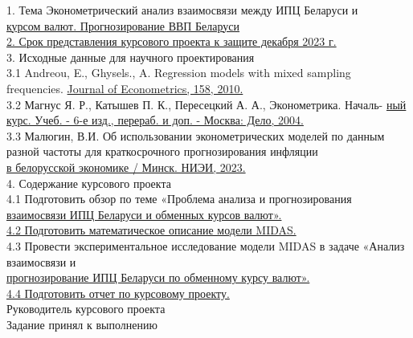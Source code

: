\documentclass[a4paper, 12pt]{extarticle}
\begin{document}
	1. Тема \hspace{3mm} Эконометрический анализ взаимосвязи между ИПЦ Беларуси и\\
	\hspace*{22mm}\underline{курсом валют. Прогнозирование ВВП Беларуси\hspace*{\linegoal}}\\[2mm]
	\underline{2. Срок представления курсового проекта к защите  \quad {} декабря 2023 г.\hspace*{\linegoal}}\\[2mm]
	3. Исходные данные для научного проектирования\\[2mm]
	3.1 Andreou, E., Ghysels., A. Regression models with mixed sampling frequencies.
	\underline{Journal of Econometrics, 158, 2010.\hspace*{\linegoal}}\\[2mm]
	3.2 Магнус Я. Р., Катышев П. К., Пересецкий А. А., Эконометрика. Началь-
	\underline{ный курс. Учеб. - 6-е изд., перераб. и доп. - Москва: Дело, 2004.\hspace*{\linegoal}} \\[2mm]
	3.3 Малюгин, В.И. Об использовании эконометрических моделей по данным разной частоты для краткосрочного прогнозирования инфляции\\
	\underline{в белорусской экономике / Минск. НИЭИ, 2023.\hspace*{\linegoal}}\\[2mm]
	4. Содержание курсового проекта\\[2mm]
	4.1 Подготовить обзор по теме «Проблема анализа и прогнозирования \\
	\underline{взаимосвязи ИПЦ Беларуси и обменных курсов валют».\hspace*{\linegoal}}\\[2mm]
	\underline{4.2 Подготовить математическое описание модели MIDAS.\hspace*{\linegoal}}\\[2mm]
	4.3 Провести экспериментальное исследование модели MIDAS в задаче «Анализ взаимосвязи и\\
	\underline{прогнозирование ИПЦ Беларуси по обменному курсу валют».\hspace*{\linegoal}}\\[2mm]
	\underline{4.4 Подготовить отчет по курсовому проекту.\hspace*{\linegoal}}\\[2mm]
	\vfill
	\noindent Руководитель курсового проекта \\[2mm]
	Задание принял к выполнению \hspace*{4mm} \\[2mm]
	\newpage
	\tableofcontents
	\newpage
\end{document}
